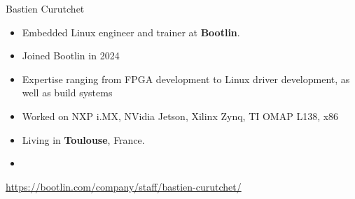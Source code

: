 \begin{frame}{Bastien Curutchet}
  \begin{itemize}
  \item Embedded Linux engineer and trainer at {\bf Bootlin}.
  \item Joined Bootlin in 2024
  \item Expertise ranging from FPGA development to Linux driver
    development, as well as build systems
  \item Worked on NXP i.MX, NVidia Jetson, Xilinx Zynq, TI OMAP L138,
    x86
  \item Living in {\bf Toulouse}, France.
  \item {}
  \end{itemize}
  {\small \url{https://bootlin.com/company/staff/bastien-curutchet/}}
\end{frame}
